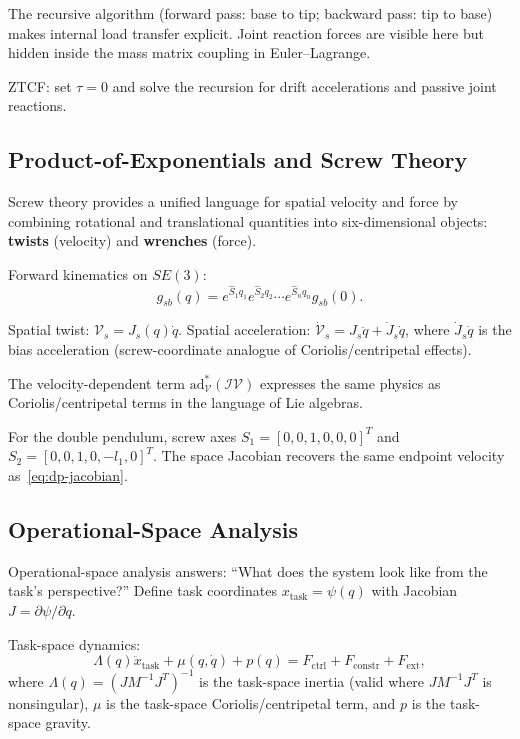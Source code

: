 \documentclass[11pt]{article}
\begin{document}
The recursive algorithm (forward pass: base to tip; backward pass: tip to base) makes internal load transfer explicit. Joint reaction forces are visible here but hidden inside the mass matrix coupling in Euler--Lagrange.

ZTCF: set $\tau=0$ and solve the recursion for drift accelerations and passive joint reactions.

\subsection{Product-of-Exponentials and Screw Theory}\label{sec:poe-screw}

Screw theory provides a unified language for spatial velocity and force by combining rotational and translational quantities into six-dimensional objects: \textbf{twists} (velocity) and \textbf{wrenches} (force).

Forward kinematics on $SE(3)$:
\begin{equation}\label{eq:poe-fk}
g_{sb}(q) = e^{\hat{S}_1 q_1}e^{\hat{S}_2 q_2}\cdots e^{\hat{S}_n q_n}g_{sb}(0).
\end{equation}

Spatial twist: $\mathcal{V}_s = J_s(q)\dot{q}$. Spatial acceleration: $\dot{\mathcal{V}}_s = J_s\ddot{q} + \dot{J}_s\dot{q}$, where $\dot{J}_s\dot{q}$ is the bias acceleration (screw-coordinate analogue of Coriolis/centripetal effects).

The velocity-dependent term $\mathrm{ad}_{\mathcal{V}}^{*}(\mathcal{I}\mathcal{V})$ expresses the same physics as Coriolis/centripetal terms in the language of Lie algebras.

For the double pendulum, screw axes $S_1 = [0,0,1,0,0,0]^T$ and $S_2 = [0,0,1,0,-l_1,0]^T$. The space Jacobian recovers the same endpoint velocity as~\eqref{eq:dp-jacobian}.

\subsection{Operational-Space Analysis}\label{sec:operational-space}

Operational-space analysis answers: ``What does the system look like from the task's perspective?'' Define task coordinates $x_{\mathrm{task}}=\psi(q)$ with Jacobian $J=\partial\psi/\partial q$.

Task-space dynamics:
\begin{equation}\label{eq:os-dynamics}
\Lambda(q)\ddot{x}_{\mathrm{task}}+\mu(q,\dot{q})+p(q) = F_{\mathrm{ctrl}}+F_{\mathrm{constr}}+F_{\mathrm{ext}},
\end{equation}
where $\Lambda(q)=(JM^{-1}J^T)^{-1}$ is the task-space inertia (valid where $JM^{-1}J^T$ is nonsingular), $\mu$ is the task-space Coriolis/centripetal term, and $p$ is the task-space gravity.
\end{document}
